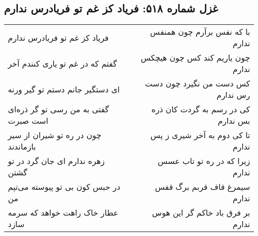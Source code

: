 \begin{center}
\section*{غزل شماره ۵۱۸: فریاد کز غم تو فریادرس ندارم}
\label{sec:518}
\begin{longtable}{l p{0.5cm} r}
فریاد کز غم تو فریادرس ندارم
&&
با که نفس برآرم چون همنفس ندارم
\\
گفتم که در غم تو یاری کنندم آخر
&&
چون یاریم کند کس چون هیچکس ندارم
\\
ای دستگیر جانم دستم تو گیر ورنه
&&
کس دست من نگیرد چون دست رس ندارم
\\
گفتی به من رسی تو گر ذره‌ای است صبرت
&&
کی در رسم به گردت کان ذره بس ندارم
\\
چون در ره تو شیران از سیر بازماندند
&&
تا کی دوم به آخر شیری ز پس ندارم
\\
زهره ندارم ای جان گرد در تو گشتن
&&
زیرا که در ره تو تاب عسس ندارم
\\
در حبس کون بی تو پیوسته می‌تپم من
&&
سیمرغ قاف قربم برگ قفس ندارم
\\
عطار خاک راهت خواهد که سرمه سازد
&&
بر فرق باد خاکم گر این هوس ندارم
\\
\end{longtable}
\end{center}
